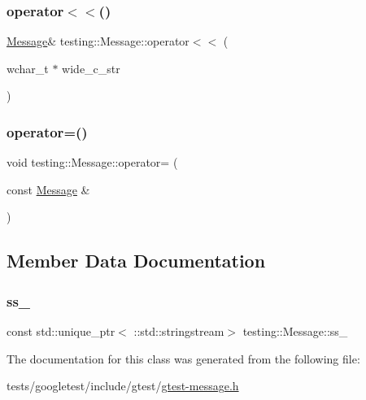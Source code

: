 \mbox{\label{classtesting_1_1Message_aae57eefb3a72a19c11453d630b1d846c}} 
\subsubsection{\texorpdfstring{operator$<$$<$()}{operator<<()}\hspace{0.1cm}{\footnotesize\ttfamily [6/6]}}
{\footnotesize\ttfamily \hyperlink{classtesting_1_1Message}{Message}\& testing\+::\+Message\+::operator$<$$<$ (\begin{DoxyParamCaption}\item[{wchar\+\_\+t $\ast$}]{wide\+\_\+c\+\_\+str }\end{DoxyParamCaption})}

\mbox{\label{classtesting_1_1Message_a5a0462b539ffb88f15ea0c67977774af}} 
\subsubsection{\texorpdfstring{operator=()}{operator=()}}
{\footnotesize\ttfamily void testing\+::\+Message\+::operator= (\begin{DoxyParamCaption}\item[{const \hyperlink{classtesting_1_1Message}{Message} \&}]{ }\end{DoxyParamCaption})\hspace{0.3cm}{\ttfamily [private]}}



\subsection{Member Data Documentation}
\mbox{\label{classtesting_1_1Message_a22a52314ba644b1eda454a82ac1fabd8}} 
\subsubsection{\texorpdfstring{ss\+\_\+}{ss\_}}
{\footnotesize\ttfamily const std\+::unique\+\_\+ptr$<$ \+::std\+::stringstream$>$ testing\+::\+Message\+::ss\+\_\+\hspace{0.3cm}{\ttfamily [private]}}



The documentation for this class was generated from the following file\+:\begin{DoxyCompactItemize}
\item 
tests/googletest/include/gtest/\hyperlink{gtest-message_8h}{gtest-\/message.\+h}\end{DoxyCompactItemize}
